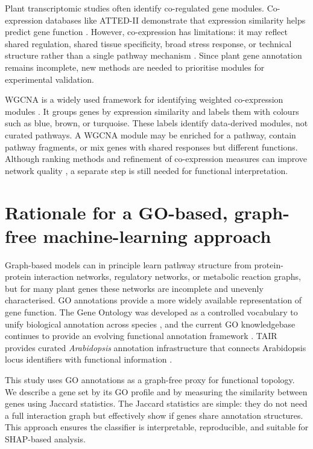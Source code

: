 \documentclass[12pt,letterpaper,oneside,openany]{book}
\begin{document}
Plant transcriptomic studies often identify co-regulated gene modules. Co-expression databases like ATTED-II demonstrate that expression similarity helps predict gene function \citep{obayashi2018atted}. However, co-expression has limitations: it may reflect shared regulation, shared tissue specificity, broad stress response, or technical structure rather than a single pathway mechanism \citep{usadel2009coexpression}. Since plant gene annotation remains incomplete, new methods are needed to prioritise modules for experimental validation.

WGCNA is a widely used framework for identifying weighted co-expression modules \citep{langfelder2008wgcna}. It groups genes by expression similarity and labels them with colours such as blue, brown, or turquoise. These labels identify data-derived modules, not curated pathways. A WGCNA module may be enriched for a pathway, contain pathway fragments, or mix genes with shared responses but different functions. Although ranking methods and refinement of co-expression measures can improve network quality \citep{liesecke2018ranking}, a separate step is still needed for functional interpretation.
\section{Rationale for a GO-based, graph-free machine-learning approach}
\label{sec:bg_go_graphfree}

Graph-based models can in principle learn pathway structure from protein-protein interaction networks, regulatory networks, or metabolic reaction graphs, but for many plant genes these networks are incomplete and unevenly characterised. GO annotations provide a more widely available representation of gene function. The Gene Ontology was developed as a controlled vocabulary to unify biological annotation across species \citep{ashburner2000gene}, and the current GO knowledgebase continues to provide an evolving functional annotation framework \citep{geneontology2023}. TAIR provides curated \textit{Arabidopsis} annotation infrastructure that connects Arabidopsis locus identifiers with functional information \citep{berardini2015tair}.

This study uses GO annotations as a graph-free proxy for functional topology. We describe a gene set by its GO profile and by measuring the similarity between genes using Jaccard statistics. The Jaccard statistics are simple: they do not need a full interaction graph but effectively show if genes share annotation structures. This approach ensures the classifier is interpretable, reproducible, and suitable for SHAP-based analysis.
\end{document}
